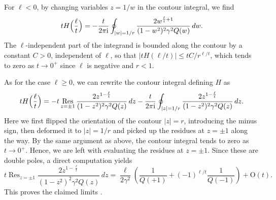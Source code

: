 \documentclass[a4paper,11pt,english]{article}
\theoremstyle{plain}
\theoremstyle{definition}
\theoremstyle{plain}
\newcommand{\iu}{\mathrm{i}}
\DeclareMathOperator*{\Res}{Res}
\begin{document}
For $\ell < 0$, by changing variables $z = 1/w$ in the contour integral, we find
\begin{equation}
    t H\Bigl( \frac{\ell}{t} \Bigr)
    =
    - \frac{t}{2\pi \iu} \oint_{|w| = 1/r} \frac{2w^{\frac{\ell}{t}+1}}{(1-w^2)^2 \gamma^2 Q(w)} \, dw .
\end{equation}
The $\ell$-independent part of the integrand is bounded along the contour by a constant $C > 0$, independent of $\ell$, so that $|t H(\ell/t)| \le t C / r^{\ell/t}$, which tends to zero as $t \to 0^+$ since $\ell$ is negative and $r < 1$.

As for the case $\ell \ge 0$, we can rewrite the contour integral defining $H$ as
\begin{equation}
    t H\Bigl( \frac{\ell}{t} \Bigr)
    =
    -
    t \Res_{z = \pm 1} \frac{2z^{1-\frac{\ell}{t}}}{(1-z^2)^2 \gamma^2 Q(z)} \, dz
    -
    \frac{t}{2\pi \iu} \oint_{|z| = 1/r} \frac{2z^{1-\frac{\ell}{t}}}{(1-z^2)^2 \gamma^2 Q(z)} \, dz .
\end{equation}
Here we first flipped the orientation of the contour $|z| = r$, introducing the minus sign, then deformed it to $|z| = 1/r$ and picked up the residues at $z = \pm 1$ along the way. By the same argument as above, the contour integral tends to zero as $t \to 0^+$. Hence, we are left with evaluating the residues at $z = \pm 1$. Since these are double poles, a direct computation yields
\begin{equation}
    t \Res_{z = \pm 1} \frac{2z^{1-\frac{\ell}{t}}}{(1-z^2)^2 \gamma^2 Q(z)} \, dz
    =
    \frac{\ell}{2\gamma^2} \left( \frac{1}{Q(+1)} + (-1)^{\ell/t} \frac{1}{Q(-1)} \right)
    +
    \mathrm{O}(t).
\end{equation}
This proves the claimed limits .
\end{document}
